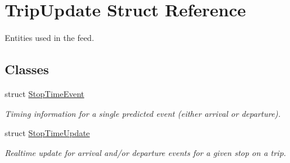 \hypertarget{structTripUpdate}{}\section{Trip\+Update Struct Reference}
\label{structTripUpdate}


Entities used in the feed.  


\subsection*{Classes}
\begin{DoxyCompactItemize}
\item 
struct \hyperlink{structTripUpdate_1_1StopTimeEvent}{Stop\+Time\+Event}
\begin{DoxyCompactList}\small\item\em Timing information for a single predicted event (either arrival or departure). \end{DoxyCompactList}\item 
struct \hyperlink{structTripUpdate_1_1StopTimeUpdate}{Stop\+Time\+Update}
\begin{DoxyCompactList}\small\item\em Realtime update for arrival and/or departure events for a given stop on a trip. \end{DoxyCompactList}\end{DoxyCompactItemize}
